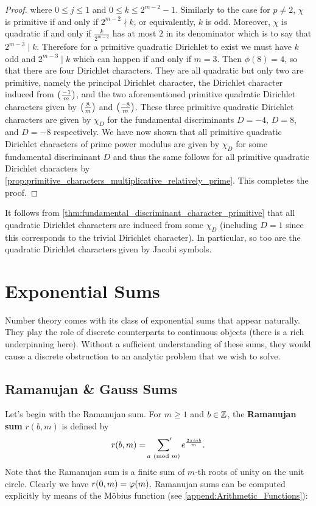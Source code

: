 \begin{proof}
      where $0 \le j \le 1$ and $0 \le k \le 2^{m-2}-1$. Similarly to the case for $p \neq 2$, $\chi$ is primitive if and only if $2^{m-2} \nmid k$, or equivalently, $k$ is odd. Moreover, $\chi$ is quadratic if and only if $\frac{k}{2^{m-2}}$ has at most $2$ in its denominator which is to say that $2^{m-3} \mid k$. Therefore for a primitive quadratic Dirichlet to exist we must have $k$ odd and $2^{m-3} \mid k$ which can happen if and only if $m = 3$. Then $\phi(8) = 4$, so that there are four Dirichlet characters. They are all quadratic but only two are primitive, namely the principal Dirichlet character, the Dirichlet character induced from $\textstyle{\left(\frac{-1}{m}\right)}$, and the two aforementioned primitive quadratic Dirichlet characters given by $\textstyle{\left(\frac{8}{m}\right)}$ and $\textstyle{\left(\frac{-8}{m}\right)}$. These three primitive quadratic Dirichlet characters are given by $\chi_{D}$ for the fundamental discriminants $D = -4$, $D = 8$, and $D = -8$ respectively. We have now shown that all primitive quadratic Dirichlet characters of prime power modulus are given by $\chi_{D}$ for some fundamental discriminant $D$ and thus the same follows for all primitive quadratic Dirichlet characters by \cref{prop:primitive_characters_multiplicative_relatively_prime}. This completes the proof.
    \end{proof}

    It follows from \cref{thm:fundamental_discriminant_character_primitive} that all quadratic Dirichlet characters are induced from some $\chi_{D}$ (including $D = 1$ since this corresponds to the trivial Dirichlet character). In particular, so too are the quadratic Dirichlet characters given by Jacobi symbols.
  \section{Exponential Sums}
    Number theory comes with its class of exponential sums that appear naturally. They play the role of discrete counterparts to continuous objects (there is a rich underpinning here). Without a sufficient understanding of these sums, they would cause a discrete obstruction to an analytic problem that we wish to solve.
    \subsection*{Ramanujan \& Gauss Sums}
      Let's begin with the Ramanujan sum. For $m \ge 1$ and $b \in \mathbb{Z}$, the \textbf{Ramanujan sum} $r(b,m)$ is defined by
      \[
        r(b,m) = \sideset{}{'}\sum_{a \ \left(\text{mod }m\right)}e^{\frac{2\pi iab}{m}}.
      \]
      Note that the Ramanujan sum is a finite sum of $m$-th roots of unity on the unit circle. Clearly we have $r(0,m) = \varphi(m)$. Ramanujan sums can be computed explicitly by means of the M\"obius function (see \cref{append:Arithmetic_Functions}):

